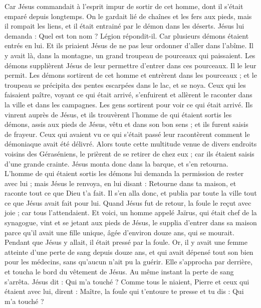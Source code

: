 \begin{multicols}{2}
Car Jésus commandait à l'esprit impur de sortir de cet homme, dont il s’était emparé depuis longtemps. On le gardait lié de chaînes et les fers aux pieds, mais il rompait les liens, et il était entrainé par le démon dans les déserts.
Jésus lui demanda : Quel est ton nom ? Légion répondit-il. Car plusieurs démons étaient entrés en lui.
Et ils priaient Jésus de ne pas leur ordonner d’aller dans l'abîme.
Il y avait là, dans la montagne, un grand troupeau de pourceaux qui paissaient. Les démons supplièrent Jésus de leur permettre d'entrer dans ces pourceaux. Il le leur permit.
Les démons sortirent de cet homme et entrèrent dans les pourceaux ; et le troupeau se précipita des pentes escarpées dans le lac, et se noya.
Ceux qui les faisaient paître, voyant ce qui était arrivé, s'enfuirent et allèrent le raconter dans la ville et dans les campagnes.
Les gens sortirent pour voir ce qui était arrivé. Ils vinrent auprès de Jésus, et ils trouvèrent l'homme de qui étaient sortis les démons, assis aux pieds de Jésus, vêtu et dans son bon sens ; et ils furent saisis de frayeur.
Ceux qui avaient vu ce qui s’était passé leur racontèrent comment le démoniaque avait été délivré.
Alors toute cette multitude venue de divers endroits voisins des Géraséniens, le prièrent de se retirer de chez eux ; car ils étaient saisis d'une grande crainte. Jésus monta donc dans la barque, et s'en retourna.
L'homme de qui étaient sortis les démons lui demanda la permission de rester avec lui ; mais Jésus le renvoya, en lui disant :
Retourne dans ta maison, et raconte tout ce que Dieu t’a fait. Il s'en alla donc, et publia par toute la ville tout ce que Jésus avait fait pour lui.
Quand Jésus fut de retour, la foule le reçut avec joie ; car tous l'attendaient.
Et voici, un homme appelé Jaïrus, qui était chef de la synagogue, vint et se jetant aux pieds de Jésus, le supplia d’entrer dans sa maison
parce qu’il avait une fille unique, âgée d'environ douze ans, qui se mourait. Pendant que Jésus y allait, il était pressé par la foule.
Or, il y avait une femme atteinte d’une perte de sang depuis douze ans, et qui avait dépensé tout son bien pour les médecins, sans qu’aucun n’ait pu la guérir.
Elle s’approcha par derrière, et toucha le bord du vêtement de Jésus. Au même instant la perte de sang s'arrêta.
Jésus dit : Qui m'a touché ? Comme tous le niaient, Pierre et ceux qui étaient avec lui, dirent : Maître, la foule qui t’entoure te presse et tu dis : Qui m'a touché ?

\end{multicols}
